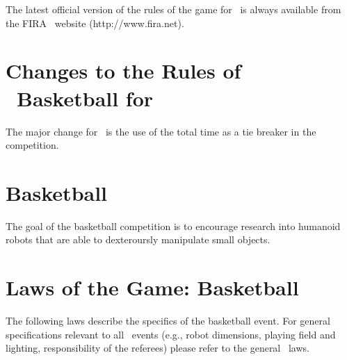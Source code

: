 \documentclass[12pt]{hurocup}
\begin{document}
The latest official version of the rules of the game for \HuroCup\ is
always available from the FIRA \HuroCup\ website (http://www.fira.net).

\section*{Changes to the Rules of \HuroCup\ Basketball for \thisyear}

The major change for \thisyear\ is the use of the total time as a tie
breaker in the competition.

\newpage

\section{Basketball}
\label{sec:basketball} 

The goal of the basketball competition is to encourage research into
humanoid robots that are able to dexteroursly manipulate small
objects.

\section{Laws of the Game: Basketball}
\label{sec:basketball-laws}

The following laws describe the specifics of the basketball
event. For general specifications relevant to all \HuroCup\ events
(e.g., robot dimensions, playing field and lighting, responsibility of
the referees) please refer to the general \HuroCup\ laws.

\label{bb-field}
\end{document}
